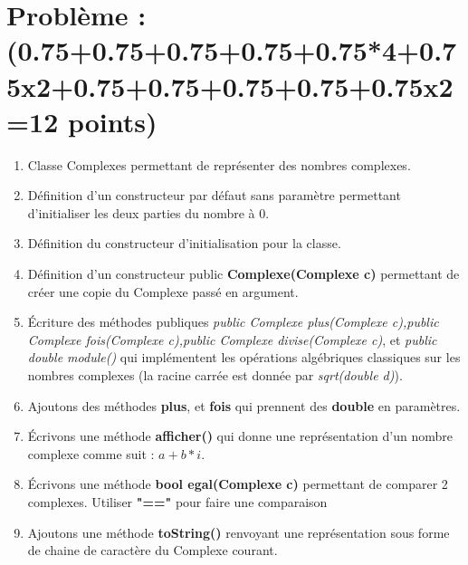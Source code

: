 \section*{Problème : \scriptsize{(0.75+0.75+0.75+0.75+0.75*4+0.75x2+0.75+0.75+0.75+0.75+0.75x2=12 points)} }

\begin{enumerate}
      \item {Classe Complexes permettant de représenter des nombres complexes. }
      \item {Définition d'un constructeur par défaut sans
            paramètre permettant d’initialiser les deux
            parties du nombre à 0. }
            \newpage
      \item {Définition du constructeur d’initialisation pour la classe. }
      \item {Définition d'un constructeur public \textbf{Complexe(Complexe c)} permettant de créer une copie du Complexe passé en argument. }
            \newpage
      \item {Écriture des méthodes publiques \textit{public Complexe plus(Complexe c),public Complexe fois(Complexe c),public Complexe divise(Complexe c)}, et \textit{public double module()} qui implémentent les opérations algébriques classiques sur les nombres complexes (la racine carrée est
            donnée par \textit{sqrt(double d)}). }
            \newpage
      \item {Ajoutons des méthodes \textbf{plus}, et \textbf{fois} qui prennent des \textbf{double} en paramètres.  }
      \item {Écrivons une méthode \textbf{afficher()} qui donne une représentation d'un nombre complexe comme suit : $a+b*i$.  }
      \item {Écrivons une méthode \textbf{bool egal(Complexe c)} permettant de comparer 2 complexes. Utiliser \textbf{"=="} pour faire une comparaison  }
      \item {Ajoutons une méthode \textbf{toString()} renvoyant une représentation sous forme de chaine de caractère du Complexe courant.  }

\end{enumerate}
